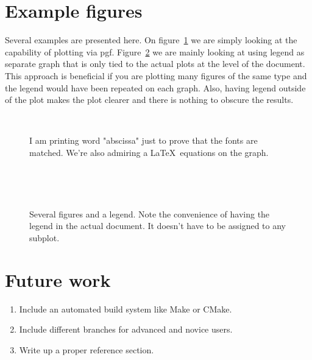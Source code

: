 \documentclass[a4paper,12pt]{article}
\begin{document}
\section{Example figures}

Several examples are presented here. On figure~\ref{fig:latex} we are simply
looking at the capability of plotting via pgf. Figure~\ref{fig:several} we are
mainly looking at using legend as separate graph that is only tied to the actual
plots at the level of the document. This approach is beneficial if you are
plotting many figures of the same type and the legend would have been repeated
on each graph. Also, having legend outside of the plot makes the plot clearer
and there is nothing to obscure the results.


\begin{figure}[t]
  \centering
  
  \\
  \caption{I am printing word "abscissa" just to prove that the fonts are
  matched. We're also admiring a \LaTeX\ equations on the graph.}
  \label{fig:latex}
\end{figure}
\begin{figure}[p]
  \begin{center}
    
    
    \\
    \vspace{5mm}
    
    
    \\
    
  \end{center}
  \caption{Several figures and a legend. Note the convenience of having the
  legend in the actual document. It doesn't have to be assigned to any subplot.}
  \label{fig:several}
\end{figure}

\section{Future work}
\begin{enumerate}
  \item Include an automated build system like Make or CMake.
  \item Include different branches for advanced and novice users.
  \item Write up a proper reference section.
\end{enumerate}
\end{document}

